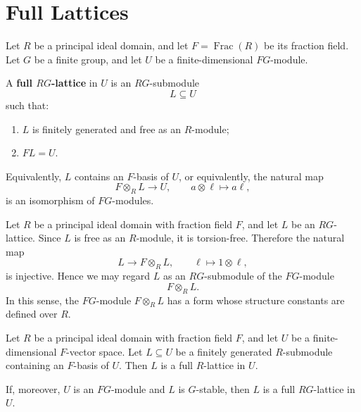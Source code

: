 \section{Full Lattices}

\begin{definition}
    Let \(R\) be a principal ideal domain, and let \(F=\operatorname{Frac}(R)\) be
    its fraction field. Let \(G\) be a finite group, and let \(U\) be a finite-dimensional
    \(FG\)-module.

    A \textbf{full \(RG\)-lattice} in \(U\) is an \(RG\)-submodule
    \[
        L\subseteq U
    \]
    such that:
    \begin{enumerate}
        \item \(L\) is finitely generated and free as an \(R\)-module;
        \item \(F L=U\).
    \end{enumerate}
    Equivalently, \(L\) contains an \(F\)-basis of \(U\), or equivalently, the natural
    map
    \[
        F\otimes_R L\longrightarrow U,
        \qquad
        a\otimes \ell\longmapsto a\ell,
    \]
    is an isomorphism of \(FG\)-modules.
\end{definition}

\begin{remark}
    Let \(R\) be a principal ideal domain with fraction field \(F\), and let \(L\)
    be an \(RG\)-lattice. Since \(L\) is free as an \(R\)-module, it is
    torsion-free. Therefore the natural map
    \[
        L\longrightarrow F\otimes_R L,
        \qquad
        \ell\longmapsto 1\otimes \ell,
    \]
    is injective. Hence we may regard \(L\) as an \(RG\)-submodule of the
    \(FG\)-module
    \[
        F\otimes_R L.
    \]
    In this sense, the \(FG\)-module \(F\otimes_R L\) has a form whose structure
    constants are defined over \(R\).
\end{remark}

\begin{lemma}
    Let \(R\) be a principal ideal domain with fraction field \(F\), and let \(U\)
    be a finite-dimensional \(F\)-vector space. Let \(L\subseteq U\) be a finitely
    generated \(R\)-submodule containing an \(F\)-basis of \(U\). Then \(L\) is a full
    \(R\)-lattice in \(U\).

    If, moreover, \(U\) is an \(FG\)-module and \(L\) is \(G\)-stable, then \(L\) is a
    full \(RG\)-lattice in \(U\).
\end{lemma}

